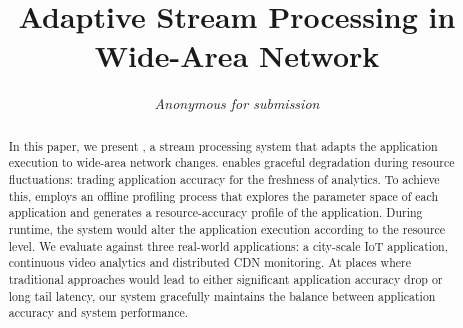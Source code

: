 \documentclass{sig-alternate-10pt}
\begin{document}



\title{Adaptive Stream Processing in Wide-Area Network}

\author{ \alignauthor \textit{Anonymous for submission} }

\maketitle

\begin{abstract}
  In this paper, we present \sysname{}, a stream processing system that adapts
  the application execution to wide-area network changes. \sysname{} enables
  graceful degradation during resource fluctuations: trading application
  accuracy for the freshness of analytics. To achieve this, \sysname{} employs
  an offline profiling process that explores the parameter space of each
  application and generates a resource-accuracy profile of the
  application. During runtime, the system would alter the application execution
  according to the resource level. We evaluate \sysname{} against three
  real-world applications: a city-scale IoT application, continuous video
  analytics and distributed CDN monitoring. At places where traditional
  approaches would lead to either significant application accuracy drop or long
  tail latency, our system gracefully maintains the balance between application
  accuracy and system performance.
\end{abstract}



\newpage

\newpage



% 
% 




{}
\end{document}
